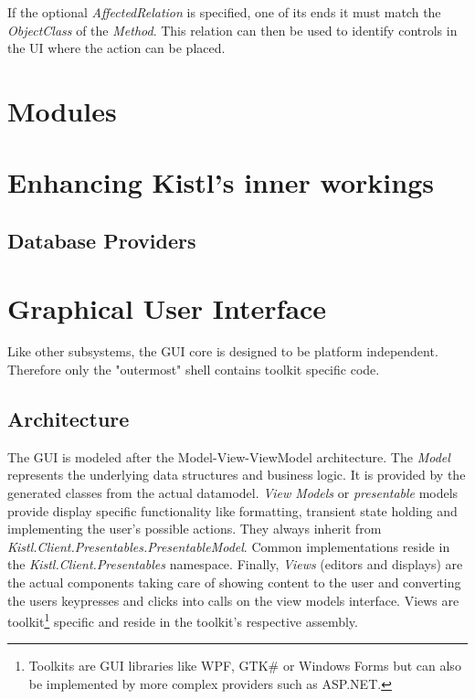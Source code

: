 If the optional \emph{AffectedRelation} is specified, one of its ends it
must match the \emph{ObjectClass} of the \emph{Method}. This relation
can then be used to identify controls in the UI where the action can be
placed.

\section{Modules}

\section{Enhancing Kistl's inner workings}

\subsection{Database Providers}

\section{Graphical User Interface}

Like other subsystems, the GUI core is designed to be platform
independent. Therefore only the "outermost" shell contains toolkit
specific code.

\subsection{Architecture}

The GUI is modeled after the Model-View-ViewModel architecture. The
\emph{Model} represents the underlying data structures and business
logic. It is provided by the generated classes from the actual
datamodel. \emph{View Models} or \emph{presentable} models provide
display specific functionality like formatting, transient state holding
and implementing the user's possible actions. They always inherit from
\emph{Kistl.Client.Presentables.PresentableModel}.
Common implementations reside in the
\emph{Kistl.Client.Presentables} namespace. Finally,
\emph{Views} (editors and displays) are the actual components taking
care of showing content to the user and converting the users keypresses
and clicks into calls on the view models interface.  Views are
toolkit\footnote{Toolkits are GUI libraries like WPF, GTK\# or Windows
Forms but can also be implemented by more complex providers such as
ASP.NET.} specific and reside in the toolkit's respective assembly.

